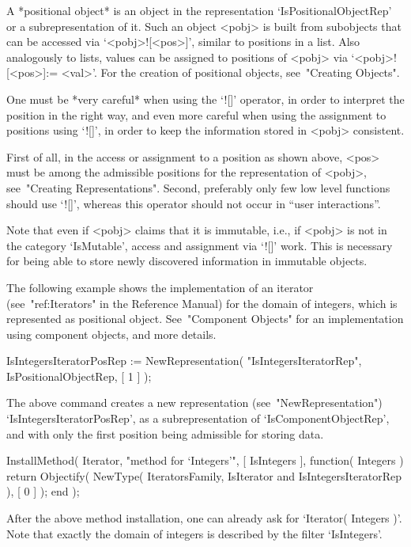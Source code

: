
A *positional object* is an object in the representation
`IsPositionalObjectRep' or a subrepresentation of it.
Such an object <pobj> is built from subobjects that can be accessed via
`<pobj>![<pos>]', similar to positions in a list.
Also analogously to lists, values can be assigned to positions of
<pobj> via `<pobj>![<pos>]:= <val>'.
For the creation of positional objects, see~"Creating Objects".

One must be *very careful* when using the `![]' operator,
in order to interpret the position in the right way,
and even more careful when using the assignment to positions using `![]',
in order to keep the information stored in <pobj> consistent.

First of all, in the access or assignment to a position as shown above,
<pos> must be among the admissible positions
for the representation of <pobj>, see~"Creating Representations".
Second, preferably only few low level functions should use `![]',
whereas this operator should not occur in ``user interactions''.

Note that even if <pobj> claims that it is immutable, i.e., if <pobj>
is not in the category `IsMutable', access and assignment via `![]' work.
This is necessary for being able to store newly discovered information
in immutable objects.

The following example shows the implementation of an iterator
(see~"ref:Iterators" in the Reference Manual) for the domain of integers,
which is represented as positional object.
See~"Component Objects" for an implementation using component objects,
and more details.

\begintt
IsIntegersIteratorPosRep := NewRepresentation( "IsIntegersIteratorRep",
    IsPositionalObjectRep, [ 1 ] );
\endtt

The above command creates a new representation (see~"NewRepresentation")
`IsIntegersIteratorPosRep',
as a subrepresentation of `IsComponentObjectRep',
and with only the first position being admissible for storing data.

\begintt
InstallMethod( Iterator,
    "method for `Integers'",
    [ IsIntegers ],
    function( Integers )
    return Objectify( NewType( IteratorsFamily,
                                   IsIterator
                               and IsIntegersIteratorRep ),
                      [ 0 ] );
    end );
\endtt

After the above method installation, one can already ask for
`Iterator( Integers )'.
Note that exactly the domain of integers is described by
the filter `IsIntegers'.

